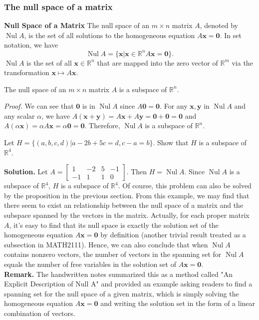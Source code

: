 \documentclass[10pt, a4paper]{article}
\newcommand{\R}{\mathbb{R}}
\begin{document}
\subsubsection*{The null space of a matrix}
\begin{definition}
    \textbf{Null Space of a Matrix} The null space of an $m\times n$ matrix $A$, denoted by $\operatorname{Nul} A$, is the set of all solutions to the homogeneous equation $A\mathbf{x} = \mathbf{0}$. In set notation, we have $$
    \operatorname{Nul} A = \{\mathbf{x} | \mathbf{x}\in\R^n A\mathbf{x} = \mathbf{0}\}.
    $$
    $\operatorname*{Nul}A$ is the set of all $\mathbf{x}\in\R^n$ that are mapped into the zero vector of $\R^m$ via the transformation $\mathbf{x}\mapsto A\mathbf{x}$.
\end{definition}
\begin{proposition}
    The null space of an $m\times n$ matrix $A$ is a subspace of $\R^n$.
\end{proposition}
\indent\textit{Proof.} We can see that $\mathbf{0}$ is in $\operatorname*{Nul}A$ since $A\mathbf{0} = \mathbf{0}$. For any $\mathbf{x}, \mathbf{y}$ in $\operatorname*{Nul}A$ and any scalar $\alpha$, we have $A(\mathbf{x} + \mathbf{y}) = A\mathbf{x} + A\mathbf{y} = \mathbf{0} + \mathbf{0} = \mathbf{0}$ and $A(\alpha\mathbf{x}) = \alpha A\mathbf{x} = \alpha\mathbf{0} = \mathbf{0}$. Therefore, $\operatorname*{Nul}A$ is a subspace of $\R^n$.
\begin{example}
    Let $H = \{(a,b,c,d)|a-2b+5c=d, c-a=b\}$. Show that $H$ is a subspace of $\R^4$.
\end{example}
\indent\textbf{Solution.} Let $A = \begin{bmatrix}
    1 & -2 & 5 & -1\\
    -1 & 1 & 1 & 0
\end{bmatrix}$. Then $H = \operatorname*{Nul}A$. Since $\operatorname*{Nul}A$ is a subspace of $\R^4$, $H$ is a subspace of $\R^4$. Of course, this problem can also be solved by the proposition in the previous section.
\indent From this example, we may find that there seem to exist an relationship between the null space of a matrix and the subspace spanned by the vectors in the matrix. 
Actually, for each proper matrix $A$, it's easy to find that its null space is exactly the solution set of the homogeneous equation $A\mathbf{x} = \mathbf{0}$ by definition (another trivial result treated as a subsection in MATH2111). 
Hence, we can also conclude that when $\operatorname*{Nul}A$ contains nonzero vectors, the number of vectors in the spanning set for $\operatorname*{Nul}A$ equals the number of free variables in the solution set of $A\mathbf{x} = \mathbf{0}$.\\
\indent\textbf{Remark.} The handwritten notes summarized this as a method called "An Explicit Description of Null A" and provided an example asking readers to find a spanning set for the null space of a given matrix, which is simply solving the homogeneous equation $A\mathbf{x} = \mathbf{0}$ and writing the solution set in the form of a linear combination of vectors.\\
\end{document}
